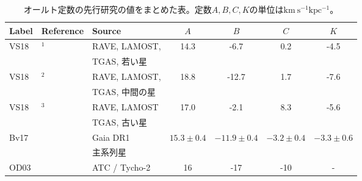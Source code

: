 \begin{table}
\begin{center}
\scriptsize
\begin{tabular}{l|l|l|c|c|c|c} \hline
 \rowcolor{LightCyan}
 Label & Reference & Source & $A$ & $B$ & $C$ & $K$\\
  \hline
 \multirow{2}{*}{VS18} & \multirow{2}{*}{\cite{VM2018}$^1$} & RAVE, LAMOST, & \multirow{2}{*}{14.3} & \multirow{2}{*}{-6.7} & \multirow{2}{*}{0.2} & \multirow{2}{*}{-4.5} 
    \\ && TGAS, 若い星 &&&& \tabularnewline[\doublerulesep] 
 \hline
 \multirow{2}{*}{VS18} & \multirow{2}{*}{\cite{VM2018}$^2$} & RAVE, LAMOST, & \multirow{2}{*}{18.8} & \multirow{2}{*}{-12.7} & \multirow{2}{*}{1.7} & \multirow{2}{*}{-7.6} 
    \\ && TGAS, 中間の星 &&&& \tabularnewline[\doublerulesep] 
 \hline
 \multirow{2}{*}{VS18} & \multirow{2}{*}{\cite{VM2018}$^3$} & RAVE, LAMOST & \multirow{2}{*}{17.0} & \multirow{2}{*}{-2.1} & \multirow{2}{*}{8.3} & \multirow{2}{*}{-5.6}
    \\ && TGAS, 古い星 &&&& \tabularnewline[\doublerulesep]
 \hline
 \multirow{2}{*}{Bv17} & \multirow{2}{*}{\cite{Bovy17}} & Gaia DR1 & \multirow{2}{*}{$15.3\pm0.4$} & \multirow{2}{*}{$-11.9\pm0.4$} & \multirow{2}{*}{$-3.2\pm0.4$} & \multirow{2}{*}{$-3.3\pm0.6$}
    \\ && 主系列星 &&&& \tabularnewline[\doublerulesep]
 \hline
 OD03 & \cite{OD03} & ATC / Tycho-2 & 16 & -17 & -10 & -\\
  \hline
\end{tabular}
\caption{オールト定数の先行研究の値をまとめた表。定数$A,B,C,K$の単位は$\mathrm{km\ s^{-1}kpc^{-1}}$。}
\label{table2}
\end{center}
\end{table}

